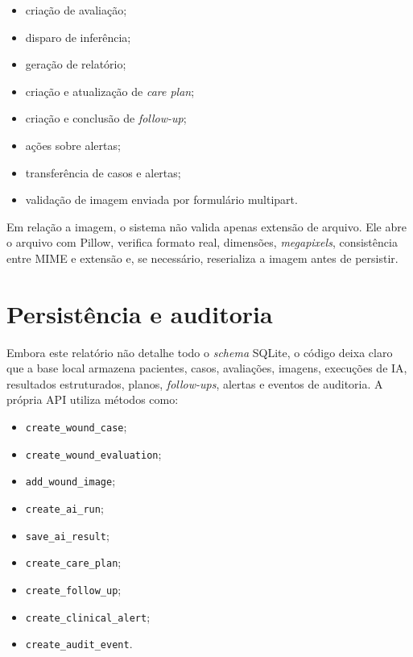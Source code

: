 \documentclass[
    12pt,
    openright,
    oneside,
    a4paper,
    chapter=TITLE,
    section=TITLE,
    brazil,
    sumario=tradicional,
    hidelinks
]{abntex2}
\begin{document}
\begin{itemize}
    \item cria\c{c}\~ao de avalia\c{c}\~ao;
    \item disparo de infer\^encia;
    \item gera\c{c}\~ao de relat\'orio;
    \item cria\c{c}\~ao e atualiza\c{c}\~ao de \textit{care plan};
    \item cria\c{c}\~ao e conclus\~ao de \textit{follow-up};
    \item a\c{c}\~oes sobre alertas;
    \item transfer\^encia de casos e alertas;
    \item valida\c{c}\~ao de imagem enviada por formul\'ario multipart.
\end{itemize}

Em rela\c{c}\~ao a imagem, o sistema n\~ao valida apenas extens\~ao de arquivo. Ele abre o arquivo com Pillow, verifica formato real, dimens\~oes, \textit{megapixels}, consist\^encia entre MIME e extens\~ao e, se necess\'ario, reserializa a imagem antes de persistir.

\section{Persist\^encia e auditoria}

Embora este relat\'orio n\~ao detalhe todo o \textit{schema} SQLite, o c\'odigo deixa claro que a base local armazena pacientes, casos, avalia\c{c}\~oes, imagens, execu\c{c}\~oes de IA, resultados estruturados, planos, \textit{follow-ups}, alertas e eventos de auditoria. A pr\'opria API utiliza m\'etodos como:

\begin{itemize}
    \item \texttt{create\_wound\_case};
    \item \texttt{create\_wound\_evaluation};
    \item \texttt{add\_wound\_image};
    \item \texttt{create\_ai\_run};
    \item \texttt{save\_ai\_result};
    \item \texttt{create\_care\_plan};
    \item \texttt{create\_follow\_up};
    \item \texttt{create\_clinical\_alert};
    \item \texttt{create\_audit\_event}.
\end{itemize}
\end{document}
